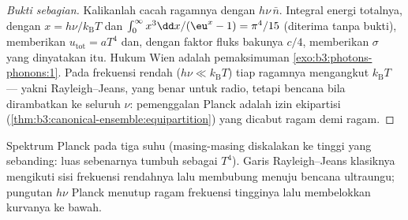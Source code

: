 \begin{proof}[Bukti sebagian]
Kalikanlah cacah ragamnya dengan $h\nu\,\bar n$. Integral energi
totalnya, dengan $x = h\nu/k_{\text{B}}T$ dan $\int_0^\infty
x^3\dd x/(\eu^x - 1) = \pi^4/15$ (diterima tanpa bukti), memberikan $u_{\text{tot}}
= aT^4$ dan, dengan faktor fluks bakunya $c/4$, memberikan
$\sigma$ yang dinyatakan itu. Hukum Wien adalah pemaksimuman
\cref{exo:b3:photons-phonons:1}. Pada frekuensi rendah ($h\nu \ll
k_{\text{B}}T$) tiap ragamnya mengangkut $k_{\text{B}}T$ ---
yakni Rayleigh--Jeans, yang benar untuk radio, tetapi bencana bila
dirambatkan ke seluruh
$\nu$: pemenggalan Planck adalah izin ekipartisi
(\cref{thm:b3:canonical-ensemble:equipartition}) yang dicabut
ragam demi ragam.
\end{proof}

\begin{omfigure}

{\small Spektrum Planck pada tiga suhu (masing-masing diskalakan ke
tinggi yang sebanding: luas sebenarnya tumbuh sebagai $T^4$). Garis
Rayleigh--Jeans klasiknya mengikuti sisi frekuensi rendahnya lalu
membubung menuju bencana ultraungu; pungutan $h\nu$ Planck
menutup ragam frekuensi tingginya lalu membelokkan kurvanya ke bawah.}
\end{omfigure}

